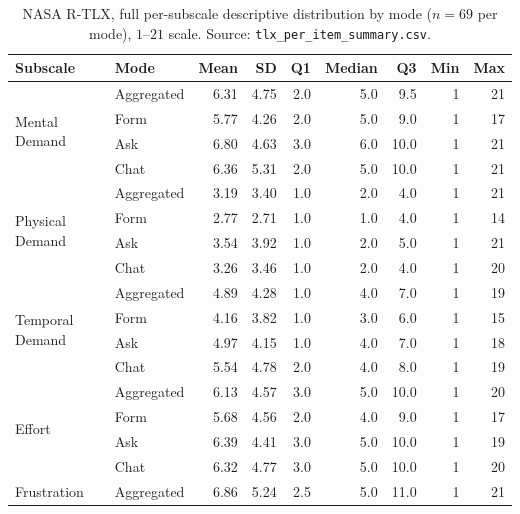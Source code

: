 \begin{table}[htbp]
\centering
\caption{NASA R-TLX, full per-subscale descriptive distribution by
mode ($n = 69$ per mode), $1$--$21$ scale. Source:
\texttt{tlx\_per\_item\_summary.csv}.}
\label{tab:rtlx-per-subscale-distribution}
\small
\begin{tabular}{@{}l l r r r r r r r@{}}
\toprule
Subscale & Mode & Mean & SD & Q1 & Median & Q3 & Min & Max \\
\midrule
\multirow{4}{*}{Mental Demand}     & Aggregated  & 6.31 & 4.75 & 2.0 & 5.0  & 9.5  & 1 & 21 \\
                                   & Form & 5.77 & 4.26 & 2.0 & 5.0  & 9.0  & 1 & 17 \\
                                   & Ask  & 6.80 & 4.63 & 3.0 & 6.0  & 10.0 & 1 & 21 \\
                                   & Chat & 6.36 & 5.31 & 2.0 & 5.0  & 10.0 & 1 & 21 \\
\midrule
\multirow{4}{*}{Physical Demand}   & Aggregated  & 3.19 & 3.40 & 1.0 & 2.0  & 4.0  & 1 & 21 \\
                                   & Form & 2.77 & 2.71 & 1.0 & 1.0  & 4.0  & 1 & 14 \\
                                   & Ask  & 3.54 & 3.92 & 1.0 & 2.0  & 5.0  & 1 & 21 \\
                                   & Chat & 3.26 & 3.46 & 1.0 & 2.0  & 4.0  & 1 & 20 \\
\midrule
\multirow{4}{*}{Temporal Demand}   & Aggregated  & 4.89 & 4.28 & 1.0 & 4.0  & 7.0  & 1 & 19 \\
                                   & Form & 4.16 & 3.82 & 1.0 & 3.0  & 6.0  & 1 & 15 \\
                                   & Ask  & 4.97 & 4.15 & 1.0 & 4.0  & 7.0  & 1 & 18 \\
                                   & Chat & 5.54 & 4.78 & 2.0 & 4.0  & 8.0  & 1 & 19 \\
\midrule
\multirow{4}{*}{Effort}            & Aggregated  & 6.13 & 4.57 & 3.0 & 5.0  & 10.0 & 1 & 20 \\
                                   & Form & 5.68 & 4.56 & 2.0 & 4.0  & 9.0  & 1 & 17 \\
                                   & Ask  & 6.39 & 4.41 & 3.0 & 5.0  & 10.0 & 1 & 19 \\
                                   & Chat & 6.32 & 4.77 & 3.0 & 5.0  & 10.0 & 1 & 20 \\
\midrule
\multirow{4}{*}{Frustration}       & Aggregated  & 6.86 & 5.24 & 2.5 & 5.0  & 11.0 & 1 & 21 \\

\end{tabular}
\end{table}
